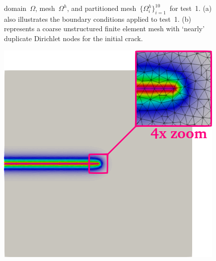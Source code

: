 \begin{figure}[tb]
\begin{minipage}[t]{.3\textwidth}
	\end{minipage}
	\caption{domain~$\Omega$, mesh~$\Omega^h$, and partitioned mesh~$\{\Omega^h_i\}_{i=1}^{10}$~for test~1. (a) also illustrates the boundary conditions applied to test~1. (b) represents a coarse unstructured finite element mesh with `nearly' duplicate Dirichlet nodes for the initial crack.\label{fig:figcrack-fe-geo-crop}}
\end{figure}	

\begin{figure}[tb]
	\centering
	\begin{minipage}[t]{.3\textwidth}
		\centering \includegraphics[width=.92\textwidth]{./Images/d-level1.png}
	\end{minipage}
	\begin{minipage}[t]{.3\textwidth}

\end{minipage}
\end{figure}
